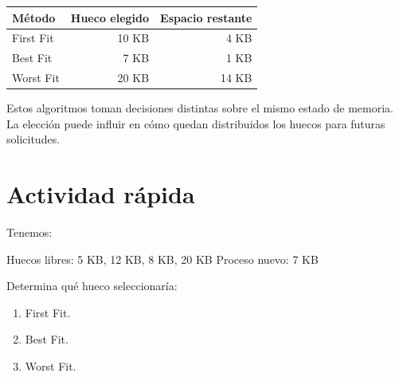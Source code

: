 \documentclass[
  spanish,
  letterpaper,
]{scrbook}
\newenvironment{Shaded}{\begin{snugshade}}{\end{snugshade}}
\newcommand{\NormalTok}[1]{\textcolor[rgb]{0.00,0.23,0.31}{#1}}
\newcounter{none} %
\providecommand{\tightlist}{%
  \setlength{\itemsep}{0pt}\setlength{\parskip}{0pt}}
\begin{document}
{\def\LTcaptype{none} %
\begin{longtable}[]{@{}lrr@{}}
\toprule\noalign{}
Método & Hueco elegido & Espacio restante \\
\midrule\noalign{}
\endhead
\bottomrule\noalign{}
\endlastfoot
First Fit & 10 KB & 4 KB \\
Best Fit & 7 KB & 1 KB \\
Worst Fit & 20 KB & 14 KB \\
\end{longtable}
}

\begin{tcolorbox}[enhanced jigsaw, arc=.35mm, bottomrule=.15mm, bottomtitle=1mm, breakable, colback=white, colbacktitle=quarto-callout-important-color!10!white, colframe=quarto-callout-important-color-frame, coltitle=black, left=2mm, leftrule=.75mm, opacityback=0, opacitybacktitle=0.6, rightrule=.15mm, title=\textcolor{quarto-callout-important-color}{\faExclamation}\hspace{0.5em}{No existe magia}, titlerule=0mm, toprule=.15mm, toptitle=1mm]

Estos algoritmos toman decisiones distintas sobre el mismo estado de
memoria. La elección puede influir en cómo quedan distribuidos los
huecos para futuras solicitudes.

\end{tcolorbox}

\section{Actividad rápida}\label{actividad-ruxe1pida}

Tenemos:

\begin{Shaded}
\begin{Highlighting}[]
\NormalTok{Huecos libres: 5 KB, 12 KB, 8 KB, 20 KB}
\NormalTok{Proceso nuevo: 7 KB}
\end{Highlighting}
\end{Shaded}

Determina qué hueco seleccionaría:

\begin{enumerate}
\def\labelenumi{\arabic{enumi}.}
\tightlist
\item
  First Fit.
\item
  Best Fit.
\item
  Worst Fit.
\end{enumerate}
\end{document}
